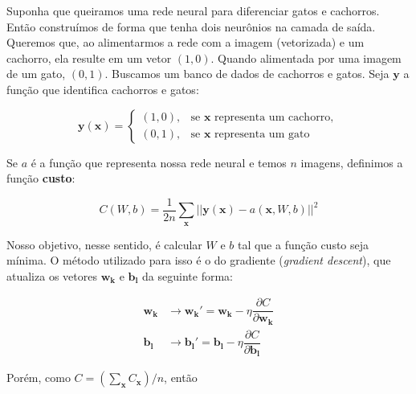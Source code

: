 \documentclass{article}
\begin{document}
            Suponha que queiramos uma rede neural para diferenciar gatos e cachorros.
            Então construímos de forma que tenha dois neurônios na camada de saída.
            Queremos que, ao alimentarmos a rede com a imagem (vetorizada) e um cachorro, ela resulte em um vetor $(1, 0)$.
            Quando alimentada por uma imagem de um gato, $(0, 1)$.
            Buscamos um banco de dados de cachorros e gatos. Seja $\mathbf{y}$ a função que identifica cachorros e gatos:

            \begin{equation}
                \mathbf{y}(\mathbf{x}) =    \begin{cases}
                                                (1, 0), & \textrm{se } \mathbf{x} \textrm{ representa um cachorro}, \\
                                                (0, 1), & \textrm{se } \mathbf{x} \textrm{ representa um gato}
                                            \end{cases}
            \end{equation}

            Se $a$ é a função que representa nossa rede neural e temos $n$ imagens, definimos a função \textbf{custo}:
            
            \begin{equation}
                C(W, b) = \dfrac{1}{2n} \sum_{\mathbf{x}} ||\mathbf{y}(\mathbf{x}) - a(\mathbf{x}, W, b)||^2
            \end{equation}

            Nosso objetivo, nesse sentido, é calcular $W$ e $b$ tal que a função custo seja mínima.
            O método utilizado para isso é o do gradiente (\textit{gradient descent}), que atualiza os vetores $\mathbf{w_k}$ e $\mathbf{b_l}$ da seguinte forma:

            \begin{equation}
                \begin{split}
                    \mathbf{w_k} &\rightarrow \mathbf{w_k'} = \mathbf{w_k} - \eta \dfrac{\partial C}{\partial \mathbf{w_k}} \\
                    \mathbf{b_l} &\rightarrow \mathbf{b_l'} = \mathbf{b_l} - \eta \dfrac{\partial C}{\partial \mathbf{b_l}}
                \end{split}
            \end{equation}

            Porém, como $C = (\sum_{\mathbf{x}} C_{\mathbf{x}}) / n$, então
            
\end{document}
